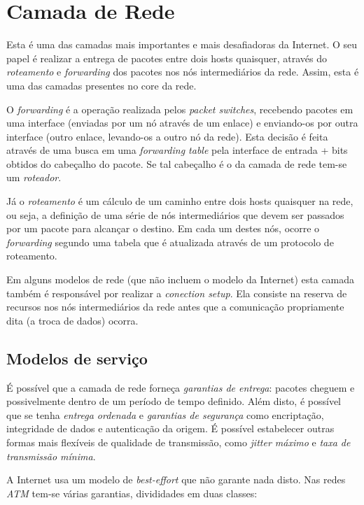 \chapter{Camada de Rede}

Esta é uma das camadas mais importantes e mais desafiadoras da Internet.
O seu papel é realizar a entrega de pacotes entre dois hosts quaisquer, 
através do \emph{roteamento} e \emph{forwarding} dos pacotes nos nós intermediários da rede.
Assim, esta é uma das camadas presentes no core da rede.

O \emph{forwarding} é a operação realizada pelos \emph{packet switches}, recebendo pacotes em uma interface (enviadas por um nó através de um enlace) 
e enviando-os por outra interface (outro enlace, levando-os a outro nó da rede).
Esta decisão é feita através de uma busca em uma \emph{forwarding table} pela interface de entrada + bits obtidos do cabeçalho do pacote.
Se tal cabeçalho é o da camada de rede tem-se um \emph{roteador}.

Já o \emph{roteamento} é um cálculo de um caminho entre dois hosts quaisquer na rede, ou seja, a definição de uma série de nós intermediários que devem ser passados por um pacote para alcançar o destino.
Em cada um destes nós, ocorre o \emph{forwarding} segundo uma tabela que é atualizada através de um protocolo de roteamento.

Em alguns modelos de rede (que não incluem o modelo da Internet) esta camada também é responsável por realizar a \emph{conection setup}.
Ela consiste na reserva de recursos nos nós intermediários da rede antes que a comunicação propriamente dita (a troca de dados) ocorra.

\section{Modelos de serviço}

É possível que a camada de rede forneça \emph{garantias de entrega}: pacotes cheguem e possivelmente dentro de um período de tempo definido.
Além disto, é possível que se tenha \emph{entrega ordenada} e \emph{garantias de segurança} como encriptação, integridade de dados e autenticação da origem.
É possível estabelecer outras formas mais flexíveis de qualidade de transmissão, como \emph{jitter máximo} e \emph{taxa de transmissão mínima}.

A Internet usa um modelo de \emph{best-effort} que não garante nada disto.
Nas redes \emph{ATM} tem-se várias garantias, divididades em duas classes:

